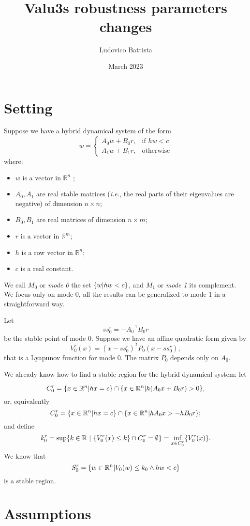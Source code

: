 \documentclass{article}
\title{Valu3s robustness parameters changes}
\author{Ludovico Battista}
\date{March 2023}
\theoremstyle{definition}
\DeclarePairedDelimiter{\set}{\{}{\}}
\newcommand{\R}{\mathbb{R}}
\begin{document}
\maketitle

\section{Setting}

Suppose we have a hybrid dynamical system of the form
\[ \dot{w} =\begin{cases}
		A_0 w + B_0 r, & \text{if $hw<c$}\\
            A_1 w + B_1 r, & \text{otherwise}
		 \end{cases} \]
where:
\begin{itemize}
    \item $w$ is a vector in $\mathbb{R}^n$ ;
    \item $A_0, A_1$ are real stable matrices (\emph{i.e.}, the real parts of their eigenvalues are negative) of dimension $n \times n$;
    \item $B_0, B_1$ are real matrices of dimension $n \times m$;
    \item $r$ is a vector in $\mathbb{R}^m$;
    \item $h$ is a row vector in $\mathbb{R}^n$;
    \item $c$ is a real constant.
\end{itemize}
We call $M_0$ or \emph{mode 0} the set $\set{w | hw<c}$, and $M_1$ or \emph{mode 1} its complement. We focus only on mode 0, all the results can be generalized to mode 1 in a straightforward way.

Let 
\[ ss_0^r = - A_0^{-1}B_0r  \]
be the stable point of mode 0.
Suppose we have an affine quadratic form given by
\[ V_0^r(x) = (x - ss_0^r)^T P_0 (x - ss_0^r), \]
that is a Lyapunov function for mode 0. The matrix $P_0$ depends only on $A_0$.

We already know how to find a stable region for the hybrid dynamical system: let

\[ C_0^r = \set{ x \in \R^n | hx = c} \cap \set{ x \in \R^n |  h(A_0 x + B_0 r) > 0 },\]
or, equivalently
\[ C_0^r = \set{ x \in \R^n | hx = c} \cap \set{ x \in \R^n |  h A_0 x > - h B_0 r   }; \]
and define
\[ k_0^r = \sup \set{k \in \R \ | \ \set{V_0^r(x) \leq k} \cap C_0^r = \emptyset }= \inf_{x \in C_0^r} \set{ V_0^r(x) }. \]
We know that 
\[ S_0^r = \set{w \in \R^n | V_0(w) \leq k_0 \wedge hw<c} \]
is a stable region.

\section{Assumptions}
\end{document}
